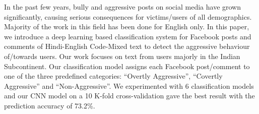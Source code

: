 In the past few years, bully and aggressive posts on social media have grown significantly, causing serious consequences for victims/users of all demographics. Majority of the work in this field has been done for English only. In this paper, we introduce a deep learning based classification system for Facebook posts and comments of Hindi-English Code-Mixed text to detect the aggressive behaviour of/towards users.  Our work focuses on text from users majorly in the Indian Subcontinent. Our classification model assigns each Facebook post/comment to one of the three predefined categories: ``Overtly Aggressive'', ``Covertly Aggressive'' and ``Non-Aggressive''. We experimented with 6 classification models and our CNN model on a 10 K-fold cross-validation gave the best result with the prediction accuracy of 73.2\%.
